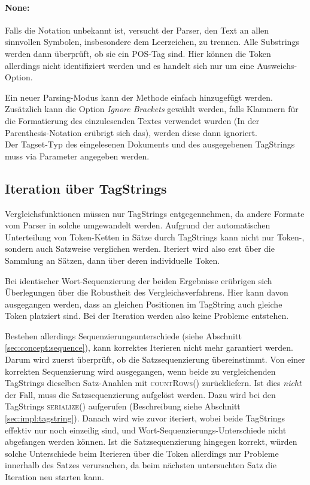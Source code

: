 \paragraph{None:} Falls die Notation unbekannt ist, versucht der Parser, den Text an allen sinnvollen Symbolen, insbesondere dem Leerzeichen, zu trennen. Alle Substrings werden dann überprüft, ob sie ein POS-Tag sind. Hier können die Token allerdings nicht identifiziert werden und es handelt sich nur um eine Ausweichs-Option. 

Ein neuer Parsing-Modus kann der Methode einfach hinzugefügt werden. Zusätzlich kann die Option \textit{\glqq Ignore Brackets\grqq{}} gewählt werden, falls Klammern für die Formatierung des einzulesenden Textes verwendet wurden (In der Parenthesis-Notation erübrigt sich das), werden diese dann ignoriert.
\\
Der Tagset-Typ des eingelesenen Dokuments und des ausgegebenen TagStrings muss via Parameter angegeben werden.

\subsection{Iteration über TagStrings}
\label{sec:impl:eval:comparison}

Vergleichsfunktionen müssen nur TagStrings entgegennehmen, da andere Formate vom Parser in solche umgewandelt werden. Aufgrund der automatischen Unterteilung von Token-Ketten in Sätze durch TagStrings kann nicht nur Token-, sondern auch Satzweise verglichen werden. Iteriert wird also erst über die Sammlung an Sätzen, dann über deren individuelle Token.

Bei identischer Wort-Sequenzierung der beiden Ergebnisse erübrigen sich Überlegungen über die Robustheit des Vergleichsverfahrens. Hier kann davon ausgegangen werden, dass an gleichen Positionen im TagString auch gleiche Token platziert sind. Bei der Iteration werden also keine Probleme entstehen.

Bestehen allerdings Sequenzierungsunterschiede (siehe Abschnitt \ref{sec:concept:sequence}), kann korrektes Iterieren nicht mehr garantiert werden. Darum wird zuerst überprüft, ob die Satzsequenzierung übereinstimmt. Von einer korrekten Sequenzierung wird ausgegangen, wenn beide zu vergleichenden TagStrings dieselben Satz-Anahlen mit \textsc{countRows()} zurückliefern. Ist dies \textit{nicht} der Fall, muss die Satzsequenzierung aufgelöst werden. Dazu wird bei den TagStrings \textsc{serialize()} aufgerufen (Beschreibung siehe Abschnitt \ref{sec:impl:tagstring}). Danach wird wie zuvor iteriert, wobei beide TagStrings effektiv nur noch einzeilig sind, und Wort-Sequenzierungs-Unterschiede nicht abgefangen werden können. Ist die Satzsequenzierung hingegen korrekt, würden solche Unterschiede beim Iterieren über die Token allerdings nur Probleme innerhalb des Satzes verursachen, da beim nächsten untersuchten Satz die Iteration neu starten kann.

